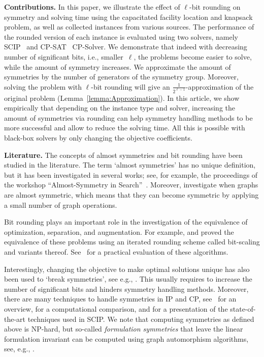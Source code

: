 \documentclass[runningheads]{llncs}
\begin{document}
\noindent
\textbf{Contributions.}
In this paper, we illustrate the effect of $\ell$-bit rounding on symmetry and solving time using the capacitated facility location and knapsack problem, as well as collected instances from various sources. The performance of the rounded version of each instance is evaluated using two solvers, namely SCIP~\cite{BestuzhevaEtAl23,BolusaniEtal2024OO} and CP-SAT~\cite{ortools_cp} CP-Solver. We demonstrate that indeed with decreasing number of significant bits, i.e., smaller~$\ell$, the problems become easier to solve, while the amount of symmetry increases. We approximate the amount of symmetries by the number of generators of the symmetry group.
Moreover, solving the problem with $\ell$-bit rounding will give an $\frac{1}{2^{\ell-1}}$-approximation of the original problem (Lemma~\ref{lemma:Approximation}).
In this article, we show empirically that depending on the instance type and solver, increasing the amount of symmetries via rounding can help symmetry handling methods to be more successful and allow to reduce the solving time.
All this is possible with black-box solvers by only changing the objective coefficients.

\noindent
\textbf{Literature.}
The concepts of almost symmetries and bit rounding have been studied in the literature.
The term `almost symmetries' has no unique definition, but it has been investigated in several works; see, for example, the proceedings of the workshop ``Almost-Symmetry in Search''~\cite{DonG05}. Moreover, \cite{KnuOP18} investigate when graphs are almost symmetric, which means that they can become symmetric by applying a small number of graph operations.

Bit rounding plays an important role in the investigation of the equivalence of optimization, separation, and augmentation. For example, \cite{schulz19950} and \cite{schulz2002complexity} proved the equivalence of these problems using an iterated rounding scheme called bit-scaling and variants thereof. See~\cite{BPPP2015} for a practical evaluation of these algorithms. 

Interestingly, changing the objective to make optimal solutions unique has also been used to `break symmetries', see e.g., \cite{GhoS11}. This usually requires to increase the number of significant bits and hinders symmetry handling methods.
Moreover, there are many techniques to handle symmetries in IP and CP, see~\cite{Mar10} for an overview, \cite{PfeR19} for a computational comparison, and \cite{BolusaniEtal2024OO} for a presentation of the state-of-the-art techniques used in SCIP.
We note that computing symmetries as defined above is NP-hard, but so-called \emph{formulation symmetries} that leave the linear formulation invariant can be computed using graph automorphism algorithms, see, e.g., \cite{PfeR19}.
\smallskip
\end{document}
